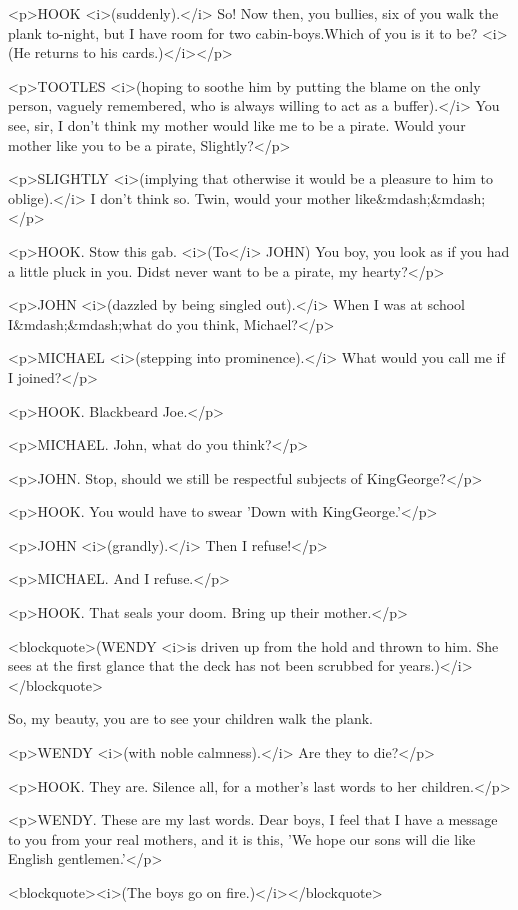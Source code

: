 <p>HOOK <i>(suddenly).</i> So! Now then, you bullies, six of you walk the plank to-night, but I have room for two cabin-boys.Which of you is it to be? <i>(He returns to his cards.)</i></p>

<p>TOOTLES <i>(hoping to soothe him by putting the blame on the only person, vaguely remembered, who is always willing to act as a buffer).</i> You see, sir, I don't think my mother would like me to be a pirate. Would your mother like you to be a pirate, Slightly?</p>

<p>SLIGHTLY <i>(implying that otherwise it would be a pleasure to him to oblige).</i> I don't think so. Twin, would your mother like&mdash;&mdash;</p>

<p>HOOK. Stow this gab. <i>(To</i> JOHN) You boy, you look as if you had a little pluck in you. Didst never want to be a pirate, my hearty?</p>

<p>JOHN <i>(dazzled by being singled out).</i> When I was at school I&mdash;&mdash;what do you think, Michael?</p>

<p>MICHAEL <i>(stepping into prominence).</i> What would you call me if I joined?</p>

<p>HOOK. Blackbeard Joe.</p>

<p>MICHAEL. John, what do you think?</p>

<p>JOHN. Stop, should we still be respectful subjects of KingGeorge?</p>

<p>HOOK. You would have to swear 'Down with KingGeorge.'</p>

<p>JOHN <i>(grandly).</i> Then I refuse!</p>

<p>MICHAEL. And I refuse.</p>

<p>HOOK. That seals your doom. Bring up their mother.</p>

<blockquote>(WENDY <i>is driven up from the hold and thrown to him. She sees at the first glance that the deck has not been scrubbed for years.)</i></blockquote>

So, my beauty, you are to see your children walk the plank. 

<p>WENDY <i>(with noble calmness).</i> Are they to die?</p>

<p>HOOK. They are. Silence all, for a mother's last words to her children.</p>

<p>WENDY. These are my last words. Dear boys, I feel that I have a message to you from your real mothers, and it is this, 'We hope our sons will die like English gentlemen.'</p>

<blockquote><i>(The boys go on fire.)</i></blockquote>

